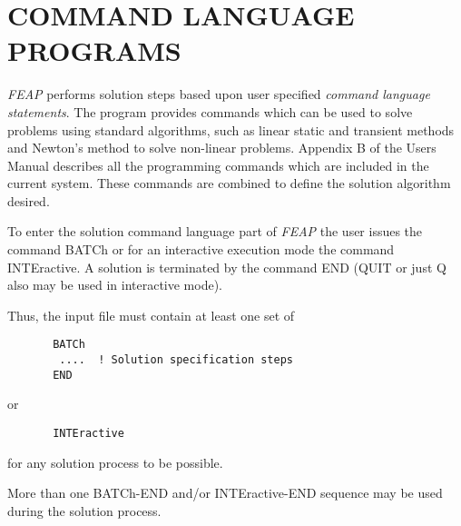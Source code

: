 \chapter[Command Language Programs]{COMMAND LANGUAGE PROGRAMS}
\label{command}

{\sl FEAP} performs solution steps based upon user specified {\it command
language statements}.  The program provides commands which can be used to solve
problems using standard algorithms, such as linear static and transient
methods and Newton's method to solve non-linear problems.
Appendix B of the Users Manual describes all the programming
commands which are included in the current system.  These commands are
combined to define the solution algorithm desired.

To enter the solution command language part of {\sl FEAP}
the user issues the command BATCh or for an
interactive execution mode the command INTEractive.  A solution
is terminated by the command END (QUIT or just Q
also may be used in interactive mode).

Thus, the input file must contain at least one set of
\begin{verbatim}
       BATCh
        ....  ! Solution specification steps
       END
\end{verbatim}
or
\begin{verbatim}
       INTEractive
\end{verbatim}
for any solution process to be possible.

More than one BATCh-END and/or
INTE\-rac\-tive-END sequence may be used during the solution process.

